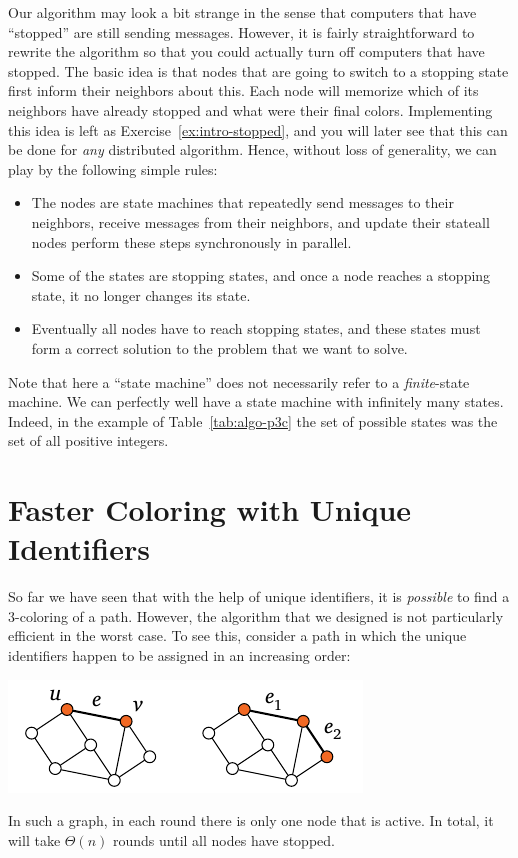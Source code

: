 Our algorithm may look a bit strange in the sense that computers that have ``stopped'' are still sending messages. However, it is fairly straightforward to rewrite the algorithm so that you could actually turn off computers that have stopped. The basic idea is that nodes that are going to switch to a stopping state first inform their neighbors about this. Each node will memorize which of its neighbors have already stopped and what were their final colors. Implementing this idea is left as Exercise~\ref{ex:intro-stopped}, and you will later see that this can be done for \emph{any} distributed algorithm. Hence, without loss of generality, we can play by the following simple rules:
\begin{itemize}
    \item The nodes are state machines that repeatedly send messages to their neighbors, receive messages from their neighbors, and update their state\mydash all nodes perform these steps synchronously in parallel.
    \item Some of the states are stopping states, and once a node reaches a stopping state, it no longer changes its state.
    \item Eventually all nodes have to reach stopping states, and these states must form a correct solution to the problem that we want to solve.
\end{itemize}
Note that here a ``state machine'' does not necessarily refer to a \emph{finite}-state machine. We can perfectly well have a state machine with infinitely many states. Indeed, in the example of Table~\ref{tab:algo-p3c} the set of possible states was the set of all positive integers.


\section{Faster Coloring with Unique Identifiers}\label{sec:algo-p3cbit}

So far we have seen that with the help of unique identifiers, it is \emph{possible} to find a $3$-coloring of a path. However, the algorithm that we designed is not particularly efficient in the worst case. To see this, consider a path in which the unique identifiers happen to be assigned in an increasing order:
\begin{center}
    \includegraphics[page=\PIntroIdBad]{figs.pdf}
\end{center}
In such a graph, in each round there is only one node that is active. In total, it will take $\Theta(n)$ rounds until all nodes have stopped.

